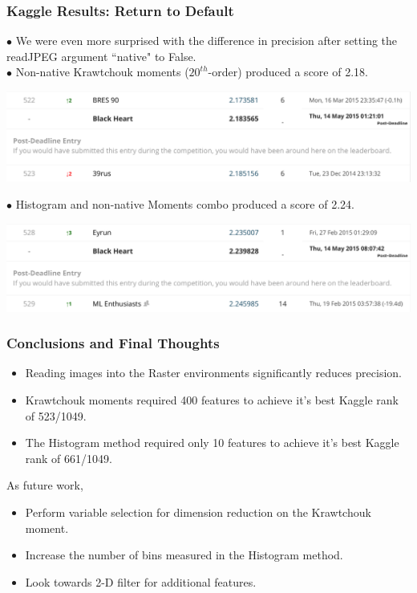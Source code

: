 \documentclass{beamer}
\begin{document}

\begin{frame}
	\frametitle{Kaggle Results: Return to Default}
$\bullet$ We were even more surprised with the difference in precision after setting the readJPEG argument ``native" to False. \\
$\bullet$ Non-native Krawtchouk moments ($20^{th}$-order) produced a score of 2.18. \\
\begin{center}
	\includegraphics[scale=0.2]{Telly.png}
\end{center}
$\bullet$ Histogram and non-native Moments combo produced a score of 2.24. \\
\begin{center}
	\includegraphics[scale=0.23]{Kolchak.png}
\end{center}
\end{frame}


\begin{frame}
	\frametitle{Conclusions and Final Thoughts}
	\begin{itemize}
		\item Reading images into the Raster environments significantly reduces precision.
		\item Krawtchouk moments required 400 features to achieve it's best Kaggle rank of 523/1049.
		\item The Histogram method required only 10 features to achieve it's best Kaggle rank of 661/1049.
	\end{itemize}
As future work, 
	\begin{itemize}
		\item Perform variable selection for dimension reduction on the Krawtchouk moment.
		\item Increase the number of bins measured in the Histogram method.
		\item Look towards 2-D filter for additional features.
	\end{itemize}
\end{frame}
\end{document}
